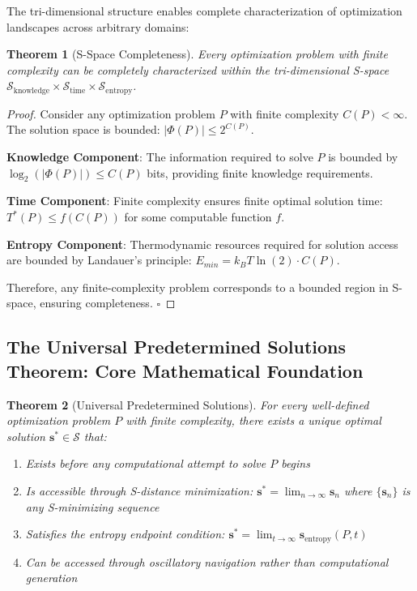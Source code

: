 \documentclass[12pt,a4paper]{article}
\newtheorem{theorem}{Theorem}
\begin{document}
The tri-dimensional structure enables complete characterization of optimization landscapes across arbitrary domains:

\begin{theorem}[S-Space Completeness]
Every optimization problem with finite complexity can be completely characterized within the tri-dimensional S-space $\mathcal{S}_{\text{knowledge}} \times \mathcal{S}_{\text{time}} \times \mathcal{S}_{\text{entropy}}$.
\end{theorem}

\begin{proof}
Consider any optimization problem $P$ with finite complexity $C(P) < \infty$. The solution space is bounded: $|\Phi(P)| \leq 2^{C(P)}$.

\textbf{Knowledge Component}: The information required to solve $P$ is bounded by $\log_2(|\Phi(P)|) \leq C(P)$ bits, providing finite knowledge requirements.

\textbf{Time Component}: Finite complexity ensures finite optimal solution time: $T^*(P) \leq f(C(P))$ for some computable function $f$.

\textbf{Entropy Component}: Thermodynamic resources required for solution access are bounded by Landauer's principle: $E_{min} = k_B T \ln(2) \cdot C(P)$.

Therefore, any finite-complexity problem corresponds to a bounded region in S-space, ensuring completeness. $\square$
\end{proof}

\subsection{The Universal Predetermined Solutions Theorem: Core Mathematical Foundation}

\begin{theorem}[Universal Predetermined Solutions]
For every well-defined optimization problem $P$ with finite complexity, there exists a unique optimal solution $\mathbf{s}^* \in \mathcal{S}$ that:
\begin{enumerate}
\item Exists before any computational attempt to solve $P$ begins
\item Is accessible through S-distance minimization: $\mathbf{s}^* = \lim_{n \to \infty} \mathbf{s}_n$ where $\{\mathbf{s}_n\}$ is any S-minimizing sequence
\item Satisfies the entropy endpoint condition: $\mathbf{s}^* = \lim_{t \to \infty} \mathbf{s}_{\text{entropy}}(P, t)$
\item Can be accessed through oscillatory navigation rather than computational generation
\end{enumerate}
\end{theorem}
\end{document}

